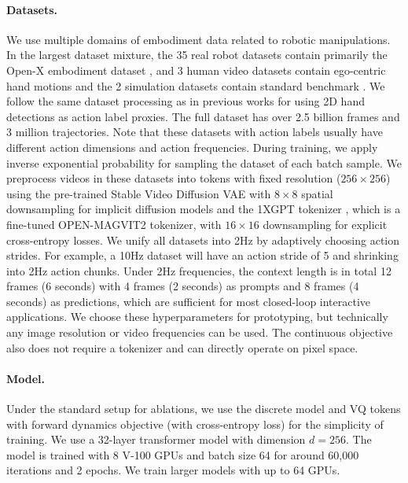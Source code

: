 \paragraph{Datasets.} We use multiple domains of embodiment data related to robotic manipulations. In the largest dataset mixture, the 35 real robot datasets contain primarily the Open-X embodiment dataset \cite{o2023open}, and 3 human video datasets contain ego-centric hand motions \cite{grauman2024ego,damen2020epic,damen2022rescaling}  and the 2 simulation datasets contain standard benchmark \cite{robomimic2021,yu2020meta}. We follow the same dataset processing as in previous works \cite{wang2024scaling} for using 2D hand detections as action label proxies.  The full dataset has over 2.5 billion frames and 3 million trajectories. Note that these datasets with action labels usually have different action dimensions and action frequencies.  During training, we apply inverse exponential probability for sampling the dataset of each batch sample. We preprocess videos in these datasets into tokens with fixed resolution ($256\times 256$) using the pre-trained Stable Video Diffusion VAE \cite{blattmann2023stable} with $8\times8$ spatial downsampling for implicit diffusion models and the 1XGPT tokenizer \cite{1X_Technologies_1X_World_Model_2024}, which is a fine-tuned OPEN-MAGVIT2 \cite{luo2024open} tokenizer, with $16\times16$ downsampling for explicit cross-entropy losses. We unify all datasets into 2Hz by adaptively choosing action strides.  For example, a 10Hz dataset will have an action stride of 5 and shrinking into 2Hz action chunks. Under 2Hz frequencies, the context length is in total 12 frames (6 seconds) with 4 frames (2 seconds) as prompts and 8 frames (4 seconds) as predictions, which are sufficient for most closed-loop interactive applications. We choose these hyperparameters for prototyping, but technically any image resolution or video frequencies can be used. The continuous objective also does not require a tokenizer and can directly operate on pixel space.



\paragraph{Model.} Under the standard setup for ablations,  we use the discrete model and VQ tokens with forward dynamics objective (with cross-entropy loss) for the simplicity of training. We use a 32-layer transformer model with dimension $d=256$. The model is trained with 8 V-100 GPUs and batch size 64 for around 60,000 iterations and 2 epochs. We train larger models with up to 64 GPUs.

